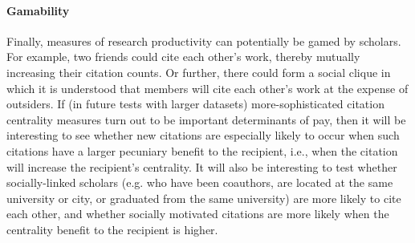 \paragraph{Gamability}
Finally, measures of research productivity can potentially be gamed by scholars. For example, two friends could cite each other’s work, thereby mutually increasing their citation counts. Or further, there could form a social clique in which it is understood that members will cite each other’s work at the expense of outsiders. If (in future tests with larger datasets) more-sophisticated citation centrality measures turn out to be important determinants of pay, then it will be interesting to see whether new citations are especially likely to occur when such citations have a larger pecuniary benefit to the recipient, i.e., when the citation will increase the recipient’s centrality. It will also be interesting to test whether socially-linked scholars (e.g. who have been coauthors, are located at the same university or city, or graduated from the same university) are more likely to cite each other, and whether socially motivated citations are more likely when the centrality benefit to the recipient is higher.
